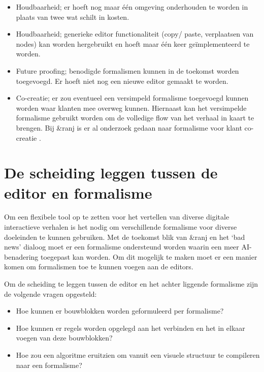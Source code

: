 \begin{itemize}
    \item Houdbaarheid; er hoeft nog maar één omgeving onderhouden te worden in plaats van twee wat schilt in kosten.
    \item Houdbaarheid; generieke editor functionaliteit (copy/ paste, verplaatsen van nodes) kan worden hergebruikt en hoeft maar één keer geïmplementeerd te worden.
    \item Future proofing; benodigde formalismen kunnen in de toekomst worden toegevoegd. Er hoeft niet nog een nieuwe editor gemaakt te worden.
    \item Co-creatie; er zou eventueel een versimpeld formalisme toegevoegd kunnen worden waar klanten mee overweg kunnen. Hiernaast kan het versimpelde formalisme gebruikt worden om de volledige flow van het verhaal in kaart te brengen. Bij \&ranj is er al onderzoek gedaan naar formalisme voor klant co-creatie \cite{Schipper2015}.
\end{itemize}

\section{De scheiding leggen tussen de editor en formalisme}
Om een flexibele tool op te zetten voor het vertellen van diverse digitale interactieve verhalen is het nodig om verschillende formalisme voor diverse doeleinden te kunnen gebruiken. Met de toekomst blik van \&ranj en het ‘bad news’ dialoog moet er een formalisme ondersteund worden waarin een meer AI-benadering toegepast kan worden. Om dit mogelijk te maken moet er een manier komen om formalismen toe te kunnen voegen aan de editors.

Om de scheiding te leggen tussen de editor en het achter liggende formalisme zijn de volgende vragen opgesteld:

\begin{itemize}
    \item Hoe kunnen er bouwblokken worden geformuleerd per formalisme?
    \item Hoe kunnen er regels worden opgelegd aan het verbinden en het in elkaar voegen van deze bouwblokken?
    \item Hoe zou een algoritme eruitzien om vanuit een visuele structuur te compileren naar een formalisme?
\end{itemize}

